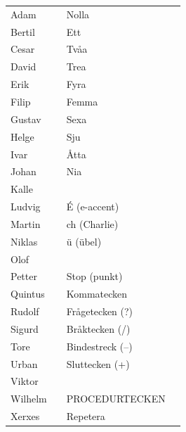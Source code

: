 \begin{table}[H]
\centering
\small
\begin{tabular}{llll}
	Adam    & \MAdam    & Nolla                 & \MNoll         \\
	Bertil  & \MBertil  & Ett                   & \MEtt          \\
	Cesar   & \MCesar   & Tvåa                  & \MTva          \\
	David   & \MDavid   & Trea                  & \MTre          \\
	Erik    & \MErik    & Fyra                  & \MFyra         \\
	Filip   & \MFilip   & Femma                 & \MFem          \\
	Gustav  & \MGustav  & Sexa                  & \MSex          \\
	Helge   & \MHelge   & Sju                   & \MSju          \\
	Ivar    & \MIvar    & Åtta                  & \MAtta         \\
	Johan   & \MJohan   & Nia                   & \MNio          \\
	Kalle   & \MKalle   &                       &                \\
	Ludvig  & \MLudvig  & É (e-accent)          & \Meaccent      \\
	Martin  & \MMartin  & ch (Charlie)          & \Mch           \\
	Niklas  & \MNiklas  & ü (übel)              & \Mubel         \\
	Olof    & \MOlof    &                       &                \\
	Petter  & \MPetter  & Stop (punkt)          & \MSTOP         \\
	Quintus & \MQvintus & Kommatecken           & \MKomma        \\
	Rudolf  & \MRudolf  & Frågetecken (?)       & \MFragetecken  \\
	Sigurd  & \MSigurd  & Bråktecken (/)        & \MBraktecken   \\
	Tore    & \MTore    & Bindestreck (--)      & \MBindestreck  \\
	Urban   & \MUrban   & Sluttecken (+)        & \MSluttecken   \\
	Viktor  & \MViktor  &                       &                \\
	Wilhelm & \MWilhelm & PROCEDURTECKEN        &                \\
	Xerxes  & \MXerxes  & Repetera              & \MRepetera     \\

\end{tabular}
\end{table}
